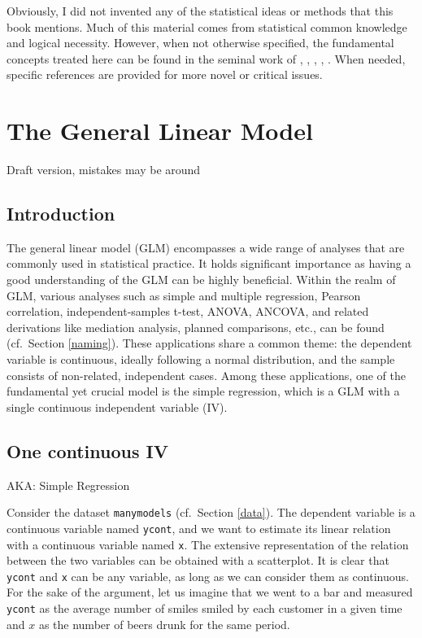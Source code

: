 \documentclass[
]{book}
\begin{document}
Obviously, I did not invented any of the statistical ideas or methods that this book mentions. Much of this material comes from statistical common knowledge and logical necessity. However, when not otherwise specified, the fundamental concepts treated here can be found in the seminal work of \citet{cohen2014applied}, \citet{searle2016linear}, \citet{raudenbush2002hierarchical}, \citet{agresticategorical}, \citet{aiken1991multiple}. When needed, specific references are provided for more novel or critical issues.

\hypertarget{glm}{%
\chapter{The General Linear Model}\label{glm}}

{ Draft version, mistakes may be around }

\hypertarget{introduction}{%
\section{Introduction}\label{introduction}}

The general linear model (GLM) encompasses a wide range of analyses that are commonly used in statistical practice. It holds significant importance as having a good understanding of the GLM can be highly beneficial. Within the realm of GLM, various analyses such as simple and multiple regression, Pearson correlation, independent-samples t-test, ANOVA, ANCOVA, and related derivations like mediation analysis, planned comparisons, etc., can be found (cf.~Section \ref{naming}). These applications share a common theme: the dependent variable is continuous, ideally following a normal distribution, and the sample consists of non-related, independent cases. Among these applications, one of the fundamental yet crucial model is the simple regression, which is a GLM with a single continuous independent variable (IV).

\hypertarget{regression}{%
\section{One continuous IV}\label{regression}}

\begin{flushright} AKA: Simple Regression  \end{flushright}

Consider the dataset \texttt{manymodels} (cf.~Section \ref{data}). The dependent variable is a continuous variable named \texttt{ycont}, and we want to estimate its linear relation with a continuous variable named \texttt{x}. The extensive representation of the relation between the two variables can be obtained with a scatterplot. It is clear that \texttt{ycont} and \texttt{x} can be any variable, as long as we can consider them as continuous. For the sake of the argument, let us imagine that we went to a bar and measured \texttt{ycont} as the average number of smiles smiled by each customer in a given time and \(x\) as the number of beers drunk for the same period.
\end{document}
